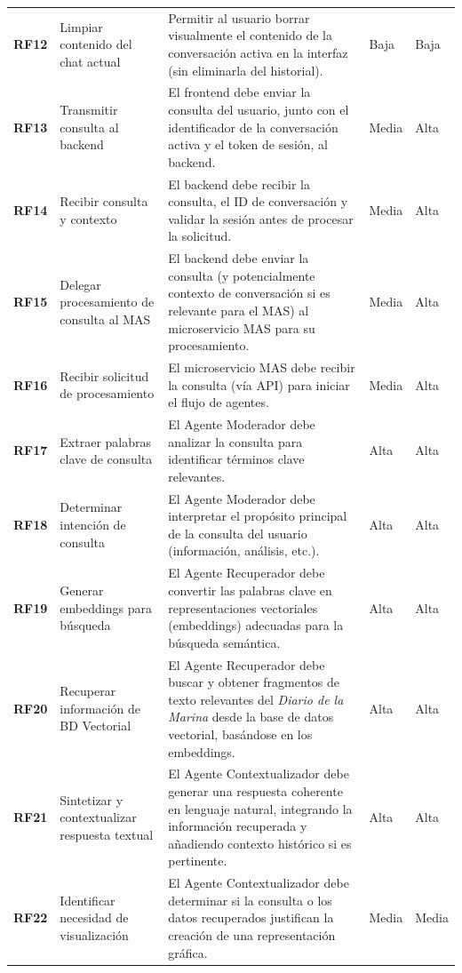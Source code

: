 \begin{longtable}{@{}l >{\raggedright\arraybackslash}p{4.5cm} >{\raggedright\arraybackslash}p{6.5cm} l l@{}}
	\textbf{RF12} & Limpiar contenido del chat actual & Permitir al usuario borrar visualmente el contenido de la conversación activa en la interfaz (sin eliminarla del historial). & Baja & Baja \\ 
	\textbf{RF13} & Transmitir consulta al backend & El frontend debe enviar la consulta del usuario, junto con el identificador de la conversación activa y el token de sesión, al backend. & Media & Alta \\ 
	\textbf{RF14} & Recibir consulta y contexto & El backend debe recibir la consulta, el ID de conversación y validar la sesión antes de procesar la solicitud. & Media & Alta \\ 
	\textbf{RF15} & Delegar procesamiento de consulta al MAS & El backend debe enviar la consulta (y potencialmente contexto de conversación si es relevante para el MAS) al microservicio MAS para su procesamiento. & Media & Alta \\ 
	\textbf{RF16} & Recibir solicitud de procesamiento & El microservicio MAS debe recibir la consulta (vía API) para iniciar el flujo de agentes. & Media & Alta \\ 
	\textbf{RF17} & Extraer palabras clave de consulta & El Agente Moderador debe analizar la consulta para identificar términos clave relevantes. & Alta & Alta \\ 
	\textbf{RF18} & Determinar intención de consulta & El Agente Moderador debe interpretar el propósito principal de la consulta del usuario (información, análisis, etc.). & Alta & Alta \\ 
	\textbf{RF19} & Generar embeddings para búsqueda & El Agente Recuperador debe convertir las palabras clave en representaciones vectoriales (embeddings) adecuadas para la búsqueda semántica. & Alta & Alta \\ 
	\textbf{RF20} & Recuperar información de BD Vectorial & El Agente Recuperador debe buscar y obtener fragmentos de texto relevantes del \textit{Diario de la Marina} desde la base de datos vectorial, basándose en los embeddings. & Alta & Alta \\ 
	\textbf{RF21} & Sintetizar y contextualizar respuesta textual & El Agente Contextualizador debe generar una respuesta coherente en lenguaje natural, integrando la información recuperada y añadiendo contexto histórico si es pertinente. & Alta & Alta \\ 
	\textbf{RF22} & Identificar necesidad de visualización & El Agente Contextualizador debe determinar si la consulta o los datos recuperados justifican la creación de una representación gráfica. & Media & Media \\ 

\end{longtable}
